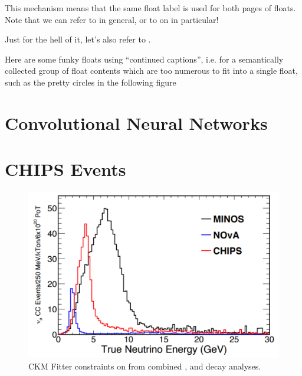 \noindent
This mechanism means that the same float label is used for both pages of
floats. Note that we can refer to  in general, or to
 on  in particular!

\noindent
Just for the hell of it, let's also refer to .

Here are some funky floats using ``continued captions'', i.e. for a semantically
collected group of float contents which are too numerous to fit into a single
float, such as the pretty circles in the following figure

\section{Convolutional Neural Networks}
\label{sec:cnn}

\section{CHIPS Events}
\label{sec:events}

\begin{figure}
    \includegraphics[width=\largefigwidth]{diagrams/4-chips/numi_axis}
    \caption[CKM Fitter constraints on \alphaCKM.]%
    {CKM Fitter constraints on \alphaCKM from combined \BToPiPi,
        \BToRhoPi and \BToRhoRho decay analyses.}
    \label{fig:numi_axis}
\end{figure}

